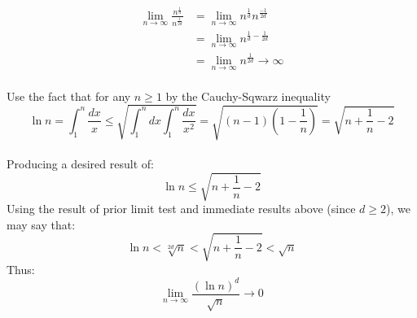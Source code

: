 \documentclass[12pt]{article}
\begin{document}
\begin{align}
\lim_{n\to\infty} \frac{n^{\frac{1}{d}}}{n^{\frac{1}{2d}}} &= \lim_{n\to\infty} n^{\frac{1}{d}} n^{\frac{-1}{2d}}\\
&= \lim_{n\to\infty} n^{\frac{1}{d}-\frac{1}{2d}}\\
&= \lim_{n\to\infty} n^{\frac{1}{2d}} \rightarrow \infty
\end{align}\\
Use the fact that for any \begin{math} n  \geq 1\end{math} by the Cauchy-Sqwarz inequality\
\[\ln{n} = \int_{1}^{n} \frac{dx}{x} \leq \sqrt{\int_{1}^{n} dx \int_{1}^{n} \frac{dx}{x^2}} = \sqrt{(n-1)(1-\frac{1}{n})} = \sqrt{n + \frac{1}{n} - 2}\]\\
Producing a desired result of:
\[\ln{n} \leq \sqrt{n + \frac{1}{n} - 2}\]
Using the result of prior limit test and immediate results above (since \begin{math}d \geq 2\end{math}), we may say that:
\[\ln{n} < \sqrt[2d]{n} < \sqrt{n + \frac{1}{n} - 2} < \sqrt{n}\]
Thus:
\[\lim_{n\to\infty} \frac{(\ln{n})^d}{\sqrt{n}} \rightarrow 0\]
\end{document}
